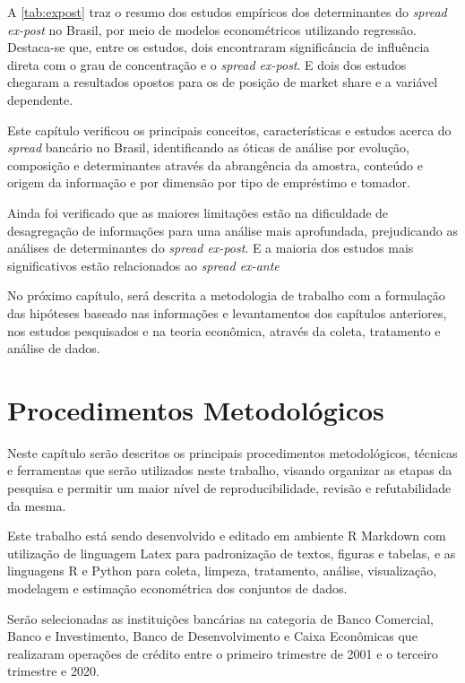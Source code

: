 \documentclass[12pt,12pt,openright,oneside,a4paper,chapter=TITLE,section=TITLE,subsection=TITLE,subsubsection=TITLE,english,french,spanish,portugues,sumario=tradicional]{abntex2}
\begin{document}
A \autoref{tab:expost} traz o resumo dos estudos empíricos dos determinantes do
\emph{spread ex-post} no Brasil, por meio de modelos econométricos utilizando
regressão. Destaca-se que, entre os estudos, dois encontraram significância de
influência direta com o grau de concentração e o \emph{spread ex-post}. E dois dos
estudos chegaram a resultados opostos para os de posição de market share e a
variável dependente.

Este capítulo verificou os principais conceitos, características e estudos acerca do \emph{spread} bancário no Brasil, identificando as óticas de análise por evolução, composição e determinantes através da abrangência da amostra, conteúdo e origem da informação e por dimensão por tipo de empréstimo e tomador.

Ainda foi verificado que as maiores limitações estão na dificuldade de desagregação de informações para uma análise mais aprofundada, prejudicando as análises de determinantes do \emph{spread ex-post}. E a maioria dos estudos mais significativos estão relacionados ao \emph{spread ex-ante}

No próximo capítulo, será descrita a metodologia de trabalho com a formulação
das hipóteses baseado nas informações e levantamentos dos capítulos anteriores,
nos estudos pesquisados e na teoria econômica, através da coleta, tratamento e
análise de dados.

\textual
\pagestyle{simple}

\chapter{Procedimentos Metodológicos}

Neste capítulo serão descritos os principais procedimentos metodológicos, técnicas e ferramentas que serão utilizados neste trabalho, visando organizar as etapas da pesquisa e permitir um maior nível de reproducibilidade, revisão e refutabilidade da mesma.

Este trabalho está sendo desenvolvido e editado em ambiente R Markdown com utilização de linguagem Latex para padronização de textos, figuras e tabelas, e as linguagens R e Python para coleta, limpeza, tratamento, análise, visualização, modelagem e estimação econométrica dos conjuntos de dados.

Serão selecionadas as instituições bancárias na categoria de Banco Comercial, Banco e Investimento, Banco de Desenvolvimento e Caixa Econômicas que realizaram operações de crédito entre o primeiro trimestre de 2001 e o terceiro trimestre e 2020.
\end{document}
